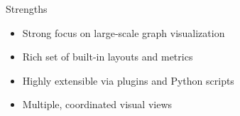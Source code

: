 \begin{frame}{Strengths}
	\begin{itemize}
		\item Strong focus on large‑scale graph visualization
		\item Rich set of built‑in layouts and metrics
		\item Highly extensible via plugins and Python scripts
		\item Multiple, coordinated visual views
	\end{itemize}
\end{frame}